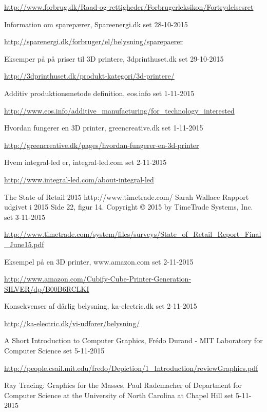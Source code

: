 \begin{thebibliography}{99}
  \url{http://www.forbrug.dk/Raad-og-rettigheder/Forbrugerleksikon/Fortrydelsesret}
  
  Information om sparepærer,
  Spareenergi.dk
  set 28-10-2015
  
  \url{http://sparenergi.dk/forbruger/el/belysning/sparepaerer}

  Eksemper på på priser til 3D printere,
  3dprinthuset.dk
  set 29-10-2015
  
  \url{http://3dprinthuset.dk/produkt-kategori/3d-printere/}

  Additiv produktionsmetode definition,
  eos.info
  set 1-11-2015
  
  \url{http://www.eos.info/additive_manufacturing/for_technology_interested}
  
  Hvordan fungerer en 3D printer,
  greencreative.dk
  set 1-11-2015
  
  \url{http://greencreative.dk/pages/hvordan-fungerer-en-3d-printer}

  Hvem integral-led er,
  integral-led.com
  set 2-11-2015
  
  \url{http://www.integral-led.com/about-integral-led}
  
  The State of Retail 2015
  http://www.timetrade.com/
  Sarah Wallace
  Rapport udgivet i 2015
  Side 22, figur 14.
  Copyright © 2015 by TimeTrade Systems, Inc.
  set 3-11-2015
  
  \url{http://www.timetrade.com/system/files/surveys/State_of_Retail_Report_Final_June15.pdf}
  
  Eksempel på en 3D printer,
  www.amazon.com
  set 2-11-2015
  
  \url{http://www.amazon.com/Cubify-Cube-Printer-Generation-SILVER/dp/B00B6RCLKI}

  Konsekvenser af dårlig belysning,
  ka-electric.dk
  set 2-11-2015

  \url{http://ka-electric.dk/vi-udforer/belysning/}

  A Short Introduction to Computer Graphics,
  Frédo Durand - MIT Laboratory for Computer Science
  set 5-11-2015

  \url{http://people.csail.mit.edu/fredo/Depiction/1_Introduction/reviewGraphics.pdf}

  Ray Tracing: Graphics for the Masses, 
  Paul Rademacher of Department for Computer Science at the University of North Carolina at Chapel Hill
  set 5-11-2015


\end{thebibliography}
